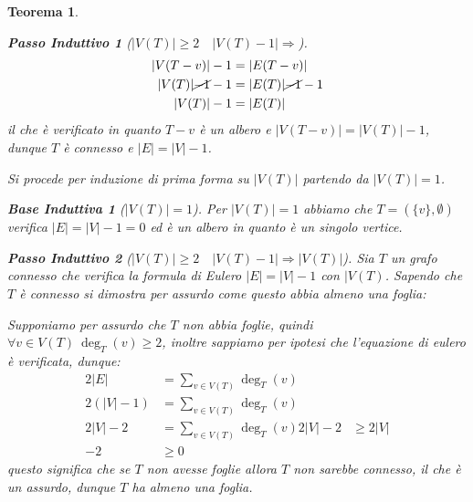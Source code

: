 \documentclass{article}
\makeatletter
\renewenvironment{proof}[1][\proofname]{\par
    \pushQED{\qed}%
    \normalfont \topsep6\p@\@plus6\p@\relax
    \trivlist
    \item\relax
    {\itshape
    #1\@addpunct{.}}\hspace\labelsep\ignorespaces
    }{%
    \popQED\endtrivlist\@endpefalse
}
\newtheorem{theorem}{Teorema}[part]
\newtheorem*{base}{Base Induttiva}
\newtheorem*{step}{Passo Induttivo}
\makeatother
\begin{document}
\begin{theorem}
\begin{proof}
\begin{enumerate}
\begin{step}[$|V(T)|\geq2\quad |V(T)-1|\Longrightarrow$]
\[\begin{aligned}
                                    |V(T-v)|-1&=|E(T-v)|\\
                                    |V(T)|\cancel{-1}-1&=|E(T)|\cancel{-1}-1\\
                                    |V(T)|-1&=|E(T)|
                                \end{aligned}
                            \]
                            il che è verificato in quanto \(T-v\) è un albero e \(|V(T-v)|=|V(T)|-1\), dunque \(T\) è connesso e \(|E|=|V|-1\).
                        \end{step}
                        \popQED{}
                    \item[$1\Leftarrow 5$)] Si procede per induzione di prima forma su \(|V(T)|\) partendo da \(|V(T)|=1\).
                        \begin{base}[$|V(T)|=1$]
                            Per \(|V(T)|=1\) abbiamo che \(T=(\{v\},\emptyset)\) verifica \(|E|=|V|-1=0\) ed è un albero in quanto è un singolo vertice.
                        \end{base}
                        \begin{step}[$|V(T)|\geq2\quad |V(T)-1|\Longrightarrow |V(T)|$]
                            Sia \(T\) un grafo connesso che verifica la formula di Eulero \(|E|=|V|-1\) con \(|V(T)\).
                            Sapendo che \(T\) è connesso si dimostra per assurdo come questo abbia almeno una foglia: 
                            \begin{proof}
                                Supponiamo per assurdo che \(T\) non abbia foglie, quindi \(\forall v\in V(T)\ \deg_T(v)\geq 2\), inoltre sappiamo per ipotesi che l'equazione di eulero è verificata, dunque: \[
                                    \begin{aligned}
                                        2|E|&=\sum_{v\in V(T)}\deg_T(v)\\
                                        2(|V|-1)&=\sum_{v\in V(T)}\deg_T(v)\\
                                        2|V|-2&=\sum_{v\in V(T)}\deg_T(v)
                                        2|V|-2&\geq 2|V|\\
                                        -2&\geq 0
                                    \end{aligned}
                                \]
                                questo significa che se \(T\) non avesse foglie allora \(T\) non sarebbe connesso, il che è un assurdo, dunque \(T\) ha almeno una foglia.

\end{proof}
\end{step}
\end{enumerate}
\end{proof}
\end{theorem}
\end{document}
